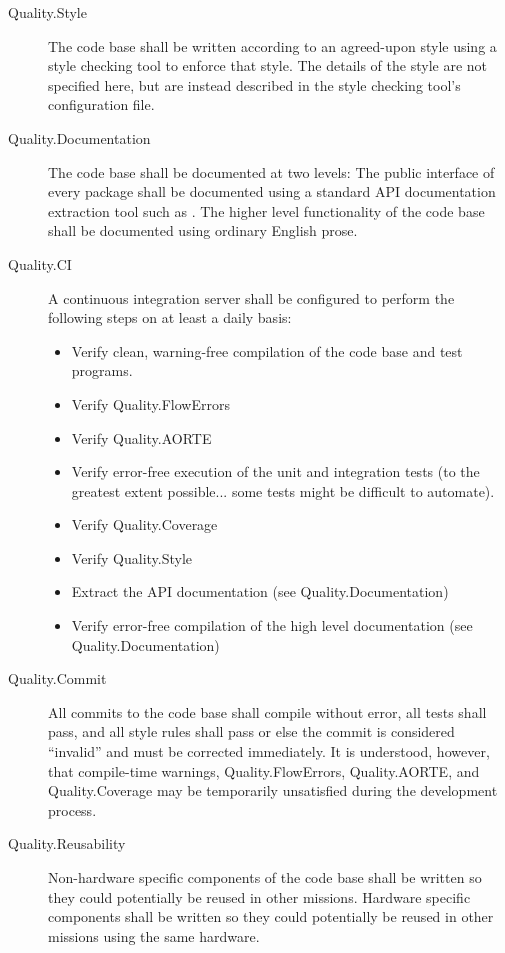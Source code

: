 \begin{description}
\item[Quality.Style] The code base shall be written according to an agreed-upon style using a style checking tool to enforce that style. The details of the style are not specified here, but are instead described in the style checking tool's configuration file.

\item[Quality.Documentation] The code base shall be documented at two levels: The public interface of every package shall be documented using a standard API documentation extraction tool such as . The higher level functionality of the code base shall be documented using ordinary English prose.
  
\item[Quality.CI] A continuous integration server shall be configured to perform the following steps on at least a daily basis:
  \begin{itemize}
  \item Verify clean, warning-free compilation of the code base and test programs.
  \item Verify Quality.FlowErrors
  \item Verify Quality.AORTE
  \item Verify error-free execution of the unit and integration tests (to the greatest extent possible... some tests might be difficult to automate).
  \item Verify Quality.Coverage
  \item Verify Quality.Style
  \item Extract the API documentation (see Quality.Documentation)
  \item Verify error-free compilation of the high level documentation (see Quality.Documentation)
  \end{itemize}

\item[Quality.Commit] All commits to the code base shall compile without error, all tests shall pass, and all style rules shall pass or else the commit is considered ``invalid'' and must be corrected immediately. It is understood, however, that compile-time warnings, Quality.FlowErrors, Quality.AORTE, and Quality.Coverage may be temporarily unsatisfied during the development process.

\item[Quality.Reusability] Non-hardware specific components of the code base shall be written so they could potentially be reused in other missions. Hardware specific components shall be written so they could potentially be reused in other missions using the same hardware.

\end{description}

